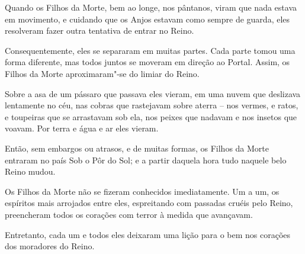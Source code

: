 Quando os Filhos da Morte, bem ao longe, nos pântanos, viram que nada
estava em movimento, e cuidando que os Anjos estavam como sempre de
guarda, eles resolveram fazer outra tentativa de entrar no Reino.

Consequentemente, eles se separaram em muitas partes. Cada parte tomou
uma forma diferente, mas todos juntos se moveram em direção ao Portal.
Assim, os Filhos da Morte aproximaram"-se do limiar do Reino.

Sobre a asa de um pássaro que passava eles vieram, em uma nuvem que
deslizava lentamente no céu, nas cobras que rastejavam sobre aterra --
nos vermes, e ratos, e toupeiras que se arrastavam sob ela, nos peixes
que nadavam e nos insetos que voavam. Por terra e água e ar eles vieram.

Então, sem embargos ou atrasos, e de muitas formas, os Filhos da Morte
entraram no país Sob o Pôr do Sol; e a partir daquela hora tudo naquele
belo Reino mudou.

Os Filhos da Morte não se fizeram conhecidos imediatamente. Um a um, os
espíritos mais arrojados entre eles, espreitando com passadas cruéis
pelo Reino, preencheram todos os corações com terror à medida que
avançavam.

Entretanto, cada um e todos eles deixaram uma lição para o bem nos
corações dos moradores do Reino.
